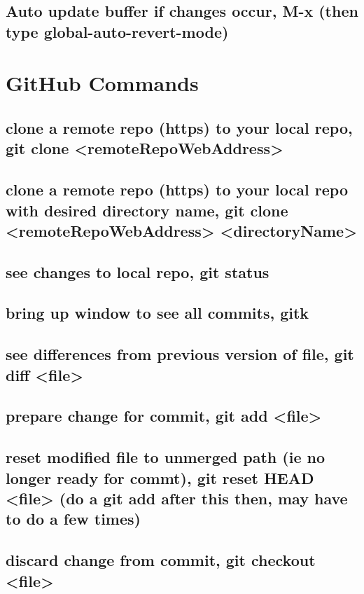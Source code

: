 \documentclass[11pt]{article}
\begin{document}
\subsection{Auto update buffer if changes occur, M-x (then type global-auto-revert-mode)}
\label{sec:orgeda078b}
\section{GitHub Commands}
\label{sec:orgb4e52b1}
\subsection{clone a remote repo (https) to your local repo, git clone <remoteRepoWebAddress>}
\label{sec:orgcebefbf}
\subsection{clone a remote repo (https) to your local repo with desired directory name, git clone <remoteRepoWebAddress> <directoryName>}
\label{sec:orgf08eaa7}
\subsection{see changes to local repo, git status}
\label{sec:org3b69743}
\subsection{bring up window to see all commits, gitk}
\label{sec:org130c70e}
\subsection{see differences from previous version of file, git diff <file>}
\label{sec:org798a83f}
\subsection{prepare change for commit, git add <file>}
\label{sec:orgccacf5e}
\subsection{reset modified file to unmerged path (ie no longer ready for commt), git reset HEAD <file> (do a git add after this then, may have to do a few times)}
\label{sec:org159ca81}
\subsection{discard change from commit, git checkout <file>}
\label{sec:org79242d0}
\end{document}
